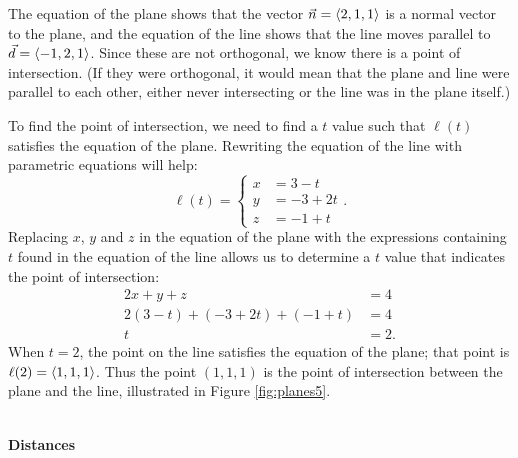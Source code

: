 {The equation of the plane shows that the vector $\vec n = \left\langle 2,1,1\right\rangle$ is a normal vector to the plane, and the equation of the line shows that the line moves parallel to $\vec d = \left\langle -1,2,1\right\rangle$. Since these are not orthogonal, we know there is a point of intersection. (If they were orthogonal, it would mean that the plane and line were parallel to each other, either never intersecting or the line was in the plane itself.)

To find the point of intersection, we need to find a $t$ value such that $\ell(t)$ satisfies the equation of the plane. Rewriting the equation of the line with parametric equations will help:
$$\ell(t) = \left\{\begin{aligned} x&= 3-t\\ y&=-3+2t\\ z&= -1+t \end{aligned}\right..$$
Replacing $x$, $y$ and $z$ in the equation of the plane with the expressions containing $t$ found in the equation of the line allows us to determine a $t$ value that indicates the point of intersection:
\begin{align*}
2x+y+z &=4 \\
2(3-t) + (-3+2t) + (-1+t) &= 4 \\
t&=2.
\end{align*}
When $t=2$, the point on the line satisfies the equation of the plane; that point is $\ell(2) = \left\langle 1,1,1\right\rangle$. Thus the point $(1,1,1)$ is the point of intersection between the plane and the line, illustrated in Figure \ref{fig:planes5}.
}\\

\noindent\textbf{\large Distances}\\

